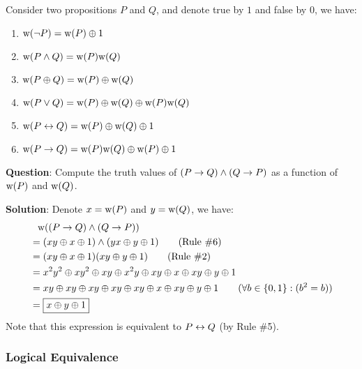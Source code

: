 \begin{definition}
    Consider two propositions $P$ and $Q$, and denote true by $1$ and false by $0$, we have:
    \begin{multicols}{2}
        \begin{enumerate}
            \item $\text{w(}\neg P\text{)} = \text{w(}P\text{)} \oplus 1$
            \item $\text{w(}P \wedge Q\text{)} = \text{w(}P\text{)}\text{w(}Q\text{)}$
            \item $\text{w(}P \oplus Q\text{)} = \text{w(}P\text{)} \oplus \text{w(}Q\text{)}$
            \item $\text{w(}P \vee Q\text{)} = \text{w(}P\text{)} \oplus \text{w(}Q\text{)} \oplus \text{w(}P\text{)}\text{w(}Q\text{)}$
            \item $\text{w(}P \leftrightarrow Q\text{)} = \text{w(}P\text{)} \oplus \text{w(}Q\text{)} \oplus 1$
            \item $\text{w(}P \rightarrow Q\text{)} = \text{w(}P\text{)}\text{w(}Q\text{)} \oplus \text{w(}P\text{)} \oplus 1$
        \end{enumerate}
    \end{multicols}
\end{definition}

\begin{example}
    \textbf{Question}: Compute the truth values of $(P \rightarrow Q) \wedge (Q \rightarrow P)$ as a function of
    $\text{w(}P\text{)}$ and $\text{w(}Q\text{)}$.

    \textbf{Solution}: Denote $x=\text{w(}P\text{)}$ and $y=\text{w(}Q\text{)}$, we have:
    \begin{align*}
        &\phantom{\mathrel{=}} \lTV{(P \lImp Q) \lAnd (Q \lImp P)} \\
        &= (xy \lXor x \lXor 1) \lAnd (yx \lXor y \lXor 1) \qquad\text{(Rule \#6)} \\
        &= (xy \lXor x \lXor 1)(xy \lXor y \lXor 1) \qquad\text{(Rule \#2)} \\
        &= x^2y^2 \lXor xy^2 \lXor xy \lXor x^2y \lXor xy \lXor x \lXor xy \lXor y \lXor 1 \\
        &= xy \lXor xy \lXor xy \lXor xy \lXor xy \lXor x \lXor xy \lXor y \lXor 1 \qquad\text{(}\forall b\in\{0, 1\}:(b^2 = b)\text{)}\\
        &= \boxed{x \lXor y \lXor 1}
    \end{align*}
    Note that this expression is equivalent to $P \leftrightarrow Q$ (by Rule \#5).
\end{example}

\subsubsection{Logical Equivalence}

